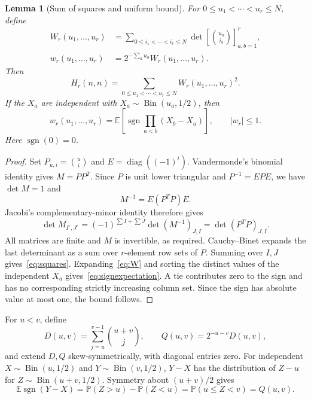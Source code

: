 \documentclass[11pt]{article}
\newtheorem{lemma}[theorem]{Lemma}
\theoremstyle{remark}
\DeclareMathOperator{\sgn}{sgn}
\newcommand{\E}{\mathbb E}
\newcommand{\Prb}{\mathbb P}
\begin{document}
\begin{lemma}[Sum of squares and uniform bound]\label{lem:squares}
For $0\le u_1<\cdots<u_r\le N$, define
\begin{align}
 W_r(u_1,\ldots,u_r)
 &=\sum_{0\le i_1<\cdots<i_r\le N}
       \det\left[\binom{u_a}{i_b}\right]_{a,b=1}^r,\label{eq:W}\\
 w_r(u_1,\ldots,u_r)&=2^{-\sum_a u_a}W_r(u_1,\ldots,u_r).
\end{align}
Then
\begin{equation}\label{eq:squares}
 H_r(n,n)=\sum_{0\le u_1<\cdots<u_r\le N}W_r(u_1,\ldots,u_r)^2.
\end{equation}
If the $X_a$ are independent with $X_a\sim\operatorname{Bin}(u_a,1/2)$, then
\begin{equation}\label{eq:signexpectation}
 w_r(u_1,\ldots,u_r)=
 \E\left[\sgn\prod_{a<b}(X_b-X_a)\right],\qquad |w_r|\le1.
\end{equation}
Here $\sgn(0)=0$.
\end{lemma}
\begin{proof}
Set $P_{u,i}=\binom ui$ and $E=\operatorname{diag}((-1)^i)$. Vandermonde's
binomial identity gives $M=PP^T$. Since $P$ is unit lower triangular and
$P^{-1}=EPE$, we have $\det M=1$ and
\[
 M^{-1}=E(P^TP)E.
\]
Jacobi's complementary-minor identity therefore gives
\[
 \det M_{I^c,J^c}
 =(-1)^{\sum I+\sum J}\det(M^{-1})_{J,I}
 =\det(P^TP)_{J,I}.
\]
All matrices are finite and $M$ is invertible, as required. Cauchy--Binet
expands the last determinant as a sum over $r$-element row sets of $P$.
Summing over $I,J$ gives~\eqref{eq:squares}. Expanding~\eqref{eq:W} and sorting
the distinct values of the independent $X_a$ gives~\eqref{eq:signexpectation}.
A tie contributes zero to the sign and has no corresponding strictly increasing
column set. Since the sign has absolute value at most one, the bound follows.
\end{proof}

For $u<v$, define
\begin{equation}\label{eq:Q}
 D(u,v)=\sum_{j=u}^{v-1}\binom{u+v}{j},\qquad
 Q(u,v)=2^{-u-v}D(u,v),
\end{equation}
and extend $D,Q$ skew-symmetrically, with diagonal entries zero. For independent
$X\sim\operatorname{Bin}(u,1/2)$ and $Y\sim\operatorname{Bin}(v,1/2)$,
$Y-X$ has the distribution of $Z-u$ for $Z\sim\operatorname{Bin}(u+v,1/2)$.
Symmetry about $(u+v)/2$ gives
\[
 \E\sgn(Y-X)=\Prb(Z>u)-\Prb(Z<u)=\Prb(u\le Z<v)=Q(u,v).
\]
\end{document}
